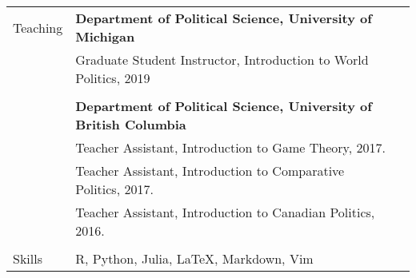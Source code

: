 \documentclass[letterpaper,11pt,oneside]{article}
\begin{document}
\begin{tabular}{@{} l l l}
  \Large{Teaching}
  & \textbf{Department of Political Science, University of Michigan} \\
     & Graduate Student Instructor, Introduction to World Politics, 2019 \\
     \\
  & \textbf{Department of Political Science, University of British Columbia} \\
     & Teacher Assistant, Introduction to Game Theory, 2017. \\     
     & Teacher Assistant, Introduction to Comparative Politics, 2017. \\
     & Teacher Assistant, Introduction to Canadian Politics, 2016. \\
     & \\
     \Large{Skills}    & R, Python, Julia, \LaTeX, Markdown, Vim \\

\end{tabular}

\vspace{2em}
\end{document}
